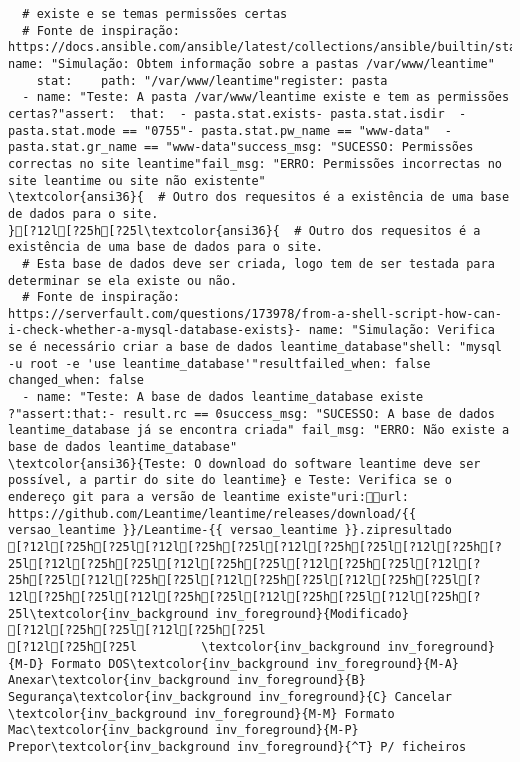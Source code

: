 \documentclass{scrartcl}
\begin{document}
\begin{Verbatim}
  # existe e se temas permissões certas
  # Fonte de inspiração: https://docs.ansible.com/ansible/latest/collections/ansible/builtin/stat_module.html}- name: "Simulação: Obtem informação sobre a pastas /var/www/leantime"
    stat:    path: "/var/www/leantime"register: pasta
  - name: "Teste: A pasta /var/www/leantime existe e tem as permissões certas?"assert:  that:  - pasta.stat.exists- pasta.stat.isdir  - pasta.stat.mode == "0755"- pasta.stat.pw_name == "www-data"  - pasta.stat.gr_name == "www-data"success_msg: "SUCESSO: Permissões correctas no site leantime"fail_msg: "ERRO: Permissões incorrectas no site leantime ou site não existente"
\textcolor{ansi36}{  # Outro dos requesitos é a existência de uma base de dados para o site.
}[?12l[?25h[?25l\textcolor{ansi36}{  # Outro dos requesitos é a existência de uma base de dados para o site.
  # Esta base de dados deve ser criada, logo tem de ser testada para determinar se ela existe ou não.
  # Fonte de inspiração: https://serverfault.com/questions/173978/from-a-shell-script-how-can-i-check-whether-a-mysql-database-exists}- name: "Simulação: Verifica se é necessário criar a base de dados leantime_database"shell: "mysql -u root -e 'use leantime_database'"resultfailed_when: false  changed_when: false
  - name: "Teste: A base de dados leantime_database existe ?"assert:that:- result.rc == 0success_msg: "SUCESSO: A base de dados leantime_database já se encontra criada" fail_msg: "ERRO: Não existe a base de dados leantime_database"
\textcolor{ansi36}{Teste: O download do software leantime deve ser possível, a partir do site do leantime} e Teste: Verifica se o endereço git para a versão de leantime existe"uri:url: https://github.com/Leantime/leantime/releases/download/{{ versao_leantime }}/Leantime-{{ versao_leantime }}.zipresultado
[?12l[?25h[?25l[?12l[?25h[?25l[?12l[?25h[?25l[?12l[?25h[?25l[?12l[?25h[?25l[?12l[?25h[?25l[?12l[?25h[?25l[?12l[?25h[?25l[?12l[?25h[?25l[?12l[?25h[?25l[?12l[?25h[?25l[?12l[?25h[?25l[?12l[?25h[?25l[?12l[?25h[?25l[?12l[?25h[?25l\textcolor{inv_background inv_foreground}{Modificado}
[?12l[?25h[?25l[?12l[?25h[?25l
[?12l[?25h[?25l         \textcolor{inv_background inv_foreground}{M-D} Formato DOS\textcolor{inv_background inv_foreground}{M-A} Anexar\textcolor{inv_background inv_foreground}{B} Segurança\textcolor{inv_background inv_foreground}{C} Cancelar           \textcolor{inv_background inv_foreground}{M-M} Formato Mac\textcolor{inv_background inv_foreground}{M-P} Prepor\textcolor{inv_background inv_foreground}{^T} P/ ficheiros

\end{Verbatim}
\end{document}

